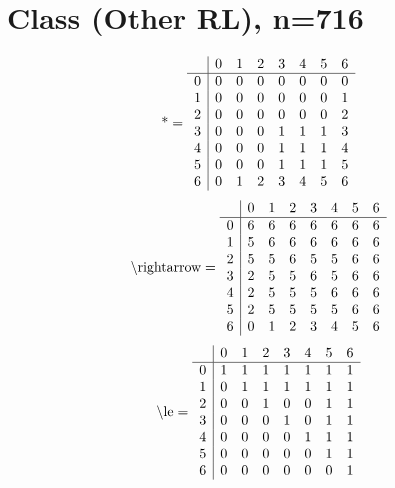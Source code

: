 \documentclass[11pt]{article}
\begin{document}
\section{Class (Other RL), n=716}
\[\text{*} = 
\begin{array}{r | r r r r r r r}
 & 0 & 1 & 2 & 3 & 4 & 5 & 6 \\ \hline
0 & 0 & 0 & 0 & 0 & 0 & 0 & 0 \\
1 & 0 & 0 & 0 & 0 & 0 & 0 & 1 \\
2 & 0 & 0 & 0 & 0 & 0 & 0 & 2 \\
3 & 0 & 0 & 0 & 1 & 1 & 1 & 3 \\
4 & 0 & 0 & 0 & 1 & 1 & 1 & 4 \\
5 & 0 & 0 & 0 & 1 & 1 & 1 & 5 \\
6 & 0 & 1 & 2 & 3 & 4 & 5 & 6 \\
\end{array}
\]
\[\text{\textbackslash rightarrow} = 
\begin{array}{r | r r r r r r r}
 & 0 & 1 & 2 & 3 & 4 & 5 & 6 \\ \hline
0 & 6 & 6 & 6 & 6 & 6 & 6 & 6 \\
1 & 5 & 6 & 6 & 6 & 6 & 6 & 6 \\
2 & 5 & 5 & 6 & 5 & 5 & 6 & 6 \\
3 & 2 & 5 & 5 & 6 & 5 & 6 & 6 \\
4 & 2 & 5 & 5 & 5 & 6 & 6 & 6 \\
5 & 2 & 5 & 5 & 5 & 5 & 6 & 6 \\
6 & 0 & 1 & 2 & 3 & 4 & 5 & 6 \\
\end{array}
\]
\[\text{\textbackslash le} = 
\begin{array}{r | r r r r r r r}
 & 0 & 1 & 2 & 3 & 4 & 5 & 6 \\ \hline
0 & 1 & 1 & 1 & 1 & 1 & 1 & 1 \\
1 & 0 & 1 & 1 & 1 & 1 & 1 & 1 \\
2 & 0 & 0 & 1 & 0 & 0 & 1 & 1 \\
3 & 0 & 0 & 0 & 1 & 0 & 1 & 1 \\
4 & 0 & 0 & 0 & 0 & 1 & 1 & 1 \\
5 & 0 & 0 & 0 & 0 & 0 & 1 & 1 \\
6 & 0 & 0 & 0 & 0 & 0 & 0 & 1 \\
\end{array}
\]
\end{document}
